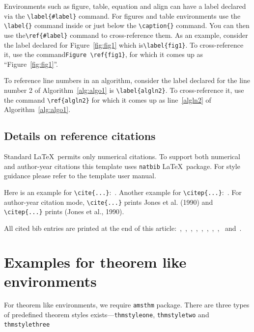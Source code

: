 \documentclass[pdflatex,sn-mathphys]{sn-jnl}%
\theoremstyle{thmstyleone}%
\theoremstyle{thmstyletwo}%
\theoremstyle{thmstylethree}%
\begin{document}
Environments such as figure, table, equation and align can have a label declared via the \verb+\label{#label}+ command.
For figures and table environments use the \verb+\label{}+ command inside or just below the \verb+\caption{}+ command.
You can then use the\verb+\ref{#label}+ command to cross-reference them.
As an example, consider the label declared for Figure~\ref{fig:fig1} which is\verb+\label{fig1}+.
To cross-reference it, use the command\verb+Figure \ref{fig1}+, for which it comes up as ``Figure~\ref{fig:fig1}''.

To reference line numbers in an algorithm, consider the label declared for the line number 2 of Algorithm~\ref{alg:algo1} is \verb+\label{algln2}+.
To cross-reference it, use the command \verb+\ref{algln2}+ for which it comes up as line~\ref{algln2} of Algorithm~\ref{alg:algo1}.


\subsection{Details on reference citations}
\label{subsec:cross-referencing:details}

Standard \LaTeX\ permits only numerical citations.
To support both numerical and author-year citations this template uses \verb+natbib+ \LaTeX\ package.
For style guidance please refer to the template user manual.

Here is an example for \verb+\cite{...}+:~\cite{bib1}.
Another example for \verb+\citep{...}+:~\citep{bib2}.
For author-year citation mode, \verb+\cite{...}+ prints Jones et al. (1990) and \verb+\citep{...}+ prints (Jones et al., 1990).

All cited bib entries are printed at the end of this article:~\cite{bib3},~\cite{bib4},~\cite{bib5},~\cite{bib6},~\cite{bib7},~\cite{bib8},~\cite{bib9},~\cite{bib10},~\cite{bib11} and~\cite{bib12}.



\section{Examples for theorem like environments}
\label{sec:examples-for-theorem-like-environments}

For theorem like environments, we require \verb+amsthm+ package.
There are three types of predefined theorem styles exists---\verb+thmstyleone+, \verb+thmstyletwo+ and \verb+thmstylethree+
\end{document}
